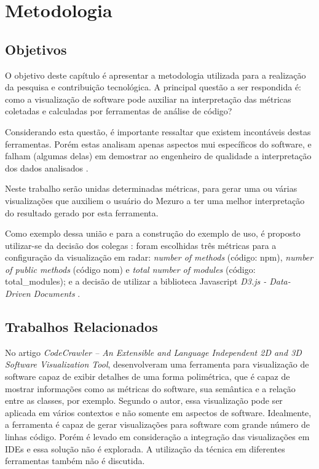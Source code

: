 \chapter{Metodologia}\label{metodologia}

\section{Objetivos}

O objetivo deste capítulo é apresentar a metodologia utilizada para a
realização da pesquisa e contribuição tecnológica. A principal questão
a ser respondida é: como a visualização de software pode auxiliar na
interpretação das métricas coletadas e calculadas por ferramentas de análise
de código?

Considerando esta questão, é importante ressaltar que existem incontáveis
destas ferramentas. Porém estas analisam apenas aspectos mui específicos
do software, e falham (algumas delas) em demostrar ao engenheiro de
qualidade a interpretação dos dados analisados \cite{deissenboeck2011quamoco}.

Neste trabalho serão unidas determinadas métricas, para gerar uma ou várias
visualizações que auxiliem o usuário do Mezuro a ter uma melhor interpretação do
resultado gerado por esta ferramenta.

Como exemplo dessa união e para a construção do exemplo de uso, é proposto
utilizar-se da decisão dos colegas :
foram escolhidas três métricas para a configuração da visualização em
radar: \textit{number of methods} (código: npm), \textit{number of public
methods} (código nom) e \textit{total number of modules} (código:
total\_modules); e a decisão de utilizar a biblioteca Javascript \textit{D3.js -
Data-Driven Documents} \cite{filgueiras2014mezuro}.

\section{Trabalhos Relacionados}

No artigo \textit{CodeCrawler – An Extensible and Language Independent 2D and
3D Software Visualization Tool}, 
desenvolveram uma ferramenta para visualização de software capaz de exibir
detalhes de uma forma polimétrica, que é capaz de mostrar informações como as
métricas do software, sua semântica e a relação entre as classes, por exemplo.
Segundo o autor, essa visualização pode ser aplicada em vários contextos e não
somente em aspectos de software. Idealmente, a ferramenta é capaz de gerar
visualizações para software com grande número de linhas código. Porém é levado
em consideração a integração das visualizações em IDEs e essa solução não é
explorada. A utilização da técnica em diferentes ferramentas também não é
discutida.

